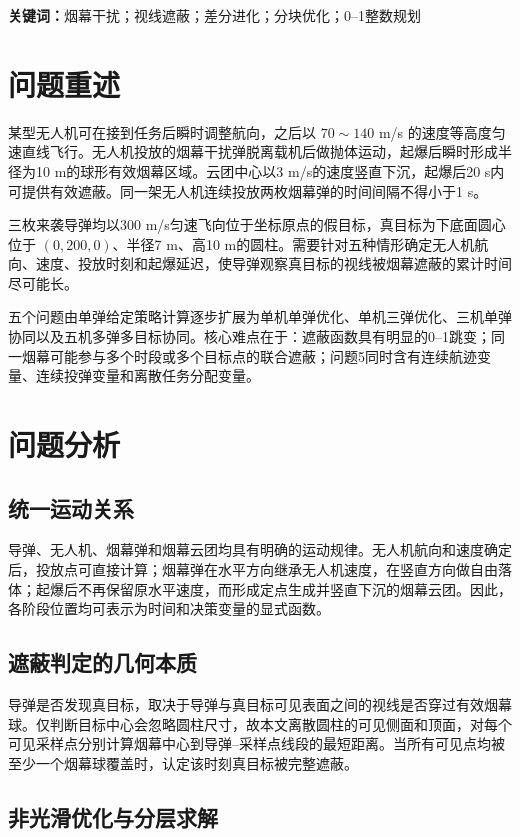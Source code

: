 \documentclass[12pt,a4paper]{ctexart}
\begin{document}
\noindent\textbf{关键词：}烟幕干扰；视线遮蔽；差分进化；分块优化；0--1整数规划

\fi
\newpage

\section{问题重述}

某型无人机可在接到任务后瞬时调整航向，之后以 $70\sim140$ m/s 的速度等高度匀速直线飞行。无人机投放的烟幕干扰弹脱离载机后做抛体运动，起爆后瞬时形成半径为10 m的球形有效烟幕区域。云团中心以3 m/s的速度竖直下沉，起爆后20 s内可提供有效遮蔽。同一架无人机连续投放两枚烟幕弹的时间间隔不得小于1 s。

三枚来袭导弹均以300 m/s匀速飞向位于坐标原点的假目标，真目标为下底面圆心位于 $(0,200,0)$、半径7 m、高10 m的圆柱。需要针对五种情形确定无人机航向、速度、投放时刻和起爆延迟，使导弹观察真目标的视线被烟幕遮蔽的累计时间尽可能长。

五个问题由单弹给定策略计算逐步扩展为单机单弹优化、单机三弹优化、三机单弹协同以及五机多弹多目标协同。核心难点在于：遮蔽函数具有明显的0--1跳变；同一烟幕可能参与多个时段或多个目标点的联合遮蔽；问题5同时含有连续航迹变量、连续投弹变量和离散任务分配变量。

\section{问题分析}

\subsection{统一运动关系}

导弹、无人机、烟幕弹和烟幕云团均具有明确的运动规律。无人机航向和速度确定后，投放点可直接计算；烟幕弹在水平方向继承无人机速度，在竖直方向做自由落体；起爆后不再保留原水平速度，而形成定点生成并竖直下沉的烟幕云团。因此，各阶段位置均可表示为时间和决策变量的显式函数。

\subsection{遮蔽判定的几何本质}

导弹是否发现真目标，取决于导弹与真目标可见表面之间的视线是否穿过有效烟幕球。仅判断目标中心会忽略圆柱尺寸，故本文离散圆柱的可见侧面和顶面，对每个可见采样点分别计算烟幕中心到导弹--采样点线段的最短距离。当所有可见点均被至少一个烟幕球覆盖时，认定该时刻真目标被完整遮蔽。

\subsection{非光滑优化与分层求解}
\end{document}
